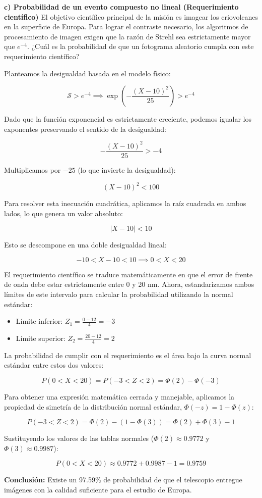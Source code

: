 \textbf{c) Probabilidad de un evento compuesto no lineal (Requerimiento científico)}
El objetivo científico principal de la misión es imagear los criovolcanes en la superficie de Europa. Para lograr el contraste necesario, los algoritmos de procesamiento de imagen exigen que la razón de Strehl sea estrictamente mayor que $e^{-4}$. ¿Cuál es la probabilidad de que un fotograma aleatorio cumpla con este requerimiento científico?

Planteamos la desigualdad basada en el modelo físico:

$$ \mathcal{S} > e^{-4} \implies \exp\left( -\frac{(X - 10)^2}{25} \right) > e^{-4} $$

Dado que la función exponencial es estrictamente creciente, podemos igualar los exponentes preservando el sentido de la desigualdad:

$$ -\frac{(X - 10)^2}{25} > -4 $$

Multiplicamos por $-25$ (lo que invierte la desigualdad):

$$ (X - 10)^2 < 100 $$

Para resolver esta inecuación cuadrática, aplicamos la raíz cuadrada en ambos lados, lo que genera un valor absoluto:

$$ |X - 10| < 10 $$

Esto se descompone en una doble desigualdad lineal:

$$ -10 < X - 10 < 10 \implies 0 < X < 20 $$

El requerimiento científico se traduce matemáticamente en que el error de frente de onda debe estar estrictamente entre 0 y 20 nm. Ahora, estandarizamos ambos límites de este intervalo para calcular la probabilidad utilizando la normal estándar:

\begin{itemize}
    \item Límite inferior: $Z_1 = \frac{0 - 12}{4} = -3$
    \item Límite superior: $Z_2 = \frac{20 - 12}{4} = 2$
\end{itemize}

La probabilidad de cumplir con el requerimiento es el área bajo la curva normal estándar entre estos dos valores:

$$ P(0 < X < 20) = P(-3 < Z < 2) = \Phi(2) - \Phi(-3) $$

Para obtener una expresión matemática cerrada y manejable, aplicamos la propiedad de simetría de la distribución normal estándar, $\Phi(-z) = 1 - \Phi(z)$:

$$ P(-3 < Z < 2) = \Phi(2) - (1 - \Phi(3)) = \Phi(2) + \Phi(3) - 1 $$

Sustituyendo los valores de las tablas normales ($\Phi(2) \approx 0.9772$ y $\Phi(3) \approx 0.9987$):

$$ P(0 < X < 20) \approx 0.9772 + 0.9987 - 1 = 0.9759 $$

\textbf{Conclusión:}
Existe un 97.59\% de probabilidad de que el telescopio entregue imágenes con la calidad suficiente para el estudio de Europa.